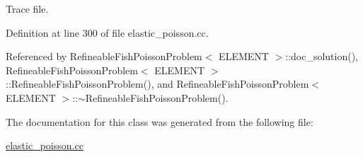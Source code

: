 Trace file. 



Definition at line 300 of file elastic\+\_\+poisson.\+cc.



Referenced by Refineable\+Fish\+Poisson\+Problem$<$ E\+L\+E\+M\+E\+N\+T $>$\+::doc\+\_\+solution(), Refineable\+Fish\+Poisson\+Problem$<$ E\+L\+E\+M\+E\+N\+T $>$\+::\+Refineable\+Fish\+Poisson\+Problem(), and Refineable\+Fish\+Poisson\+Problem$<$ E\+L\+E\+M\+E\+N\+T $>$\+::$\sim$\+Refineable\+Fish\+Poisson\+Problem().



The documentation for this class was generated from the following file\+:\begin{DoxyCompactItemize}
\item 
\hyperlink{elastic__poisson_8cc}{elastic\+\_\+poisson.\+cc}\end{DoxyCompactItemize}
